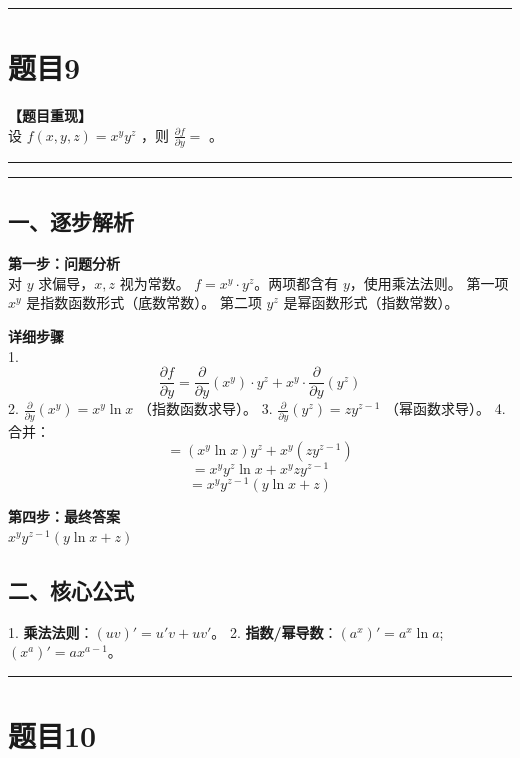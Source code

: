 \documentclass[12pt, a4paper]{ctexart}
\newcommand{\TopSeparator}{
    \par\noindent\rule{\textwidth}{1.5pt}\vspace{0.5em} %
}
\newcommand{\AnalysisSeparator}{
    \par\noindent\rule{\textwidth}{0.5pt}\vspace{0.2em}\hrule\vspace{0.5em} %
}
\newenvironment{RedAnalysis}{
    \par
    \color{red} %
}{
    \par
    \color{black} %
}
\begin{document}
\vspace{2em}

\TopSeparator
\section*{题目9}

\textbf{【题目重现】} \\
设 $ f(x, y, z) = x^{y}y^{z} $ ，则 $ \frac{\partial f}{\partial y} = $ \underline{\hspace{2cm}}。

\AnalysisSeparator

\begin{RedAnalysis}

\subsection*{一、逐步解析}

\textbf{第一步：问题分析} \\
对 $y$ 求偏导，$x, z$ 视为常数。
$f = x^y \cdot y^z$。两项都含有 $y$，使用乘法法则。
第一项 $x^y$ 是指数函数形式（底数常数）。
第二项 $y^z$ 是幂函数形式（指数常数）。

\textbf{详细步骤} \\
1. \[ \frac{\partial f}{\partial y} = \frac{\partial}{\partial y}(x^y) \cdot y^z + x^y \cdot \frac{\partial}{\partial y}(y^z) \]
2. $\frac{\partial}{\partial y}(x^y) = x^y \ln x$ （指数函数求导）。
3. $\frac{\partial}{\partial y}(y^z) = z y^{z-1}$ （幂函数求导）。
4. 合并：
   \[ = (x^y \ln x) y^z + x^y (z y^{z-1}) \]
   \[ = x^y y^z \ln x + x^y z y^{z-1} \]
   \[ = x^y y^{z-1} (y \ln x + z) \]

\textbf{第四步：最终答案} \\
$ x^y y^{z-1} (y \ln x + z) $

\subsection*{二、核心公式}
1. \textbf{乘法法则}：$(uv)' = u'v + uv'$。
2. \textbf{指数/幂导数}：$(a^x)' = a^x \ln a$; $(x^a)' = ax^{a-1}$。

\end{RedAnalysis}

\vspace{2em}

\TopSeparator
\section*{题目10}
\end{document}
